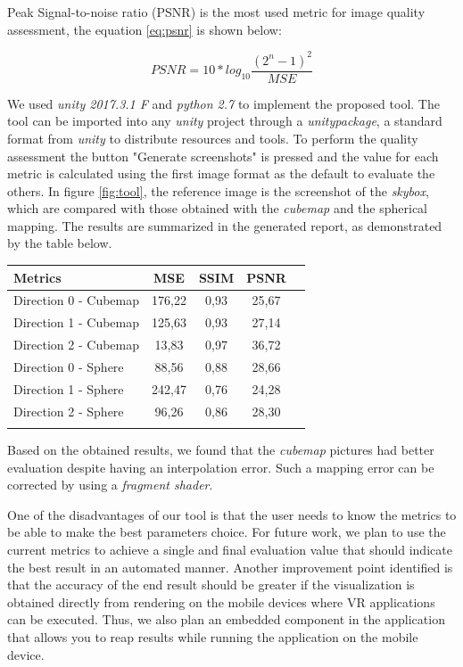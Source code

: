 \documentclass[12pt]{article}
\begin{document}
Peak Signal-to-noise ratio (PSNR) is the most used metric for image quality assessment, the equation \ref{eq:psnr} is shown below:

\begin{equation}
PSNR = 10*log_{10}{\frac{(2^n-1)^2}{MSE}}
\label{eq:psnr}
\end{equation}

We used \textit{unity 2017.3.1 F} and \textit{python 2.7} to implement the proposed tool. The tool can be imported into any \textit{unity} project through a \textit{unitypackage}, a standard format from \textit{unity} to distribute resources and tools. To perform the quality assessment the button "Generate screenshots" is pressed and the value for each metric is calculated using the first image format as the default to evaluate the others. In figure \ref{fig:tool}, the reference image is the screenshot of the \textit{skybox}, which are compared with those obtained with the \textit{cubemap} and the spherical mapping. The results are summarized in the generated report, as demonstrated by the table below.

\begin{tabular}{l*{3}{c}r}
Metrics               & MSE & SSIM & PSNR \\
\hline
Direction 0 - Cubemap & 176,22 & 0,93 & 25,67 \\
Direction 1 - Cubemap & 125,63 & 0,93 & 27,14 \\
Direction 2 - Cubemap & 13,83 & 0,97 & 36,72 \\
Direction 0 - Sphere  & 88,56 & 0,88 & 28,66 \\
Direction 1 - Sphere  & 242,47 & 0,76 & 24,28 \\
Direction 2 - Sphere  & 96,26 & 0,86 & 28,30 \\
\label{tab:metrics_results}
\end{tabular}

Based on the obtained results, we found that the \textit{cubemap} pictures had better evaluation despite having an interpolation error. Such a mapping error can be corrected by using a \textit{fragment shader}. 

One of the disadvantages of our tool is that the user needs to know the metrics to be able to make the best parameters choice. For future work, we plan to use the current metrics to achieve a single and final evaluation value that should indicate the best result in an automated manner. Another improvement point identified is that the accuracy of the end result should be greater if the visualization is obtained directly from rendering on the mobile devices where VR applications can be executed. Thus, we also plan an embedded component in the application that allows you to reap results while running the application on the mobile device.



\end{document}
